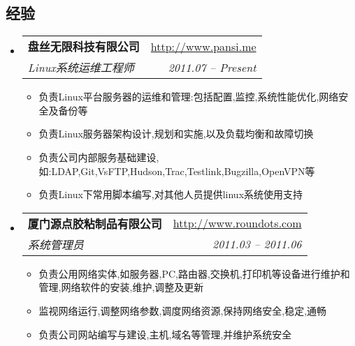 \documentclass[11pt,letterpaper]{article}
\makeatletter
\newcommand{\resitem}[1]{\item #1 \vspace{-2pt}}
\newcommand{\ressubheading}[4]{
\begin{tabular*}{6.5in}{l@{\extracolsep{\fill}}r}
	\textbf{#1} & \url{#2} \\
	\textit{#3} & \textit{#4} \\
\end{tabular*}\vspace{-6pt}}
\makeatother
\begin{document}
\begin{CJK}{UTF8}{gbsn}
\section {经验}   
	\begin{itemize}
		\item 
			\ressubheading{盘丝无限科技有限公司}{http://www.pansi.me}{Linux系统运维工程师}{2011.07 -- Present}
				{ \footnotesize
				\begin{itemize}
						\resitem{负责Linux平台服务器的运维和管理:包括配置,监控,系统性能优化,网络安全及备份等}
						\resitem{负责Linux服务器架构设计,规划和实施,以及负载均衡和故障切换}
						\resitem{负责公司内部服务基础建设,如:LDAP,Git,VsFTP,Hudson,Trac,Testlink,Bugzilla,OpenVPN等}
						\resitem{负责Linux下常用脚本编写,对其他人员提供linux系统使用支持}
				\end{itemize}
			 	}     
		\item  
			\ressubheading{厦门源点胶粘制品有限公司}{http://www.roundots.com}{系统管理员}{2011.03 -- 2011.06}
				{ \footnotesize
				\begin{itemize}
						\resitem{负责公用网络实体,如服务器,PC,路由器,交换机,打印机等设备进行维护和管理,网络软件的安装,维护,调整及更新}
						\resitem{监视网络运行,调整网络参数,调度网络资源,保持网络安全,稳定,通畅}
						\resitem{负责公司网站编写与建设,主机,域名等管理,并维护系统安全}
				\end{itemize}
				}    
	\end{itemize}


\end{CJK}
\end{document}
